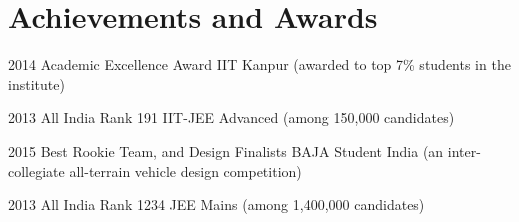 
\section{Achievements and Awards}

\cventry
{2014}
{Academic Excellence Award}
{IIT Kanpur (awarded to top 7\% students in the institute) }
{}{}{}

\cventry
{2013}
{All India Rank 191}
{IIT-JEE Advanced (among 150,000 candidates)}
{}{}{} 

\cventry
{2015}
{Best Rookie Team, and Design Finalists}
{BAJA Student India (an inter-collegiate all-terrain vehicle design competition)} 
{}{}{}

\cventry
{2013}
{All India Rank 1234} %
{JEE Mains (among 1,400,000 candidates)} %
{}{}{}

